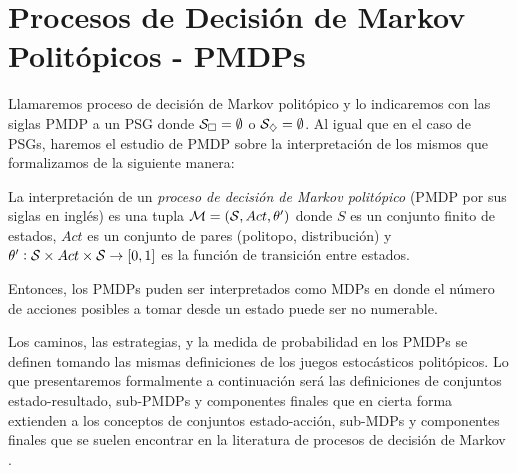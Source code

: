 \section{Procesos de Decisión de Markov Politópicos - PMDPs}
\label{sec:pmdp}

Llamaremos proceso de decisión de Markov politópico y lo indicaremos con las
siglas PMDP a un PSG donde $\mathcal{S}_\square = \emptyset$ o $\mathcal{S}_\diamondsuit = \emptyset$.
Al igual que en el caso de PSGs, haremos el estudio de PMDP sobre la
interpretación de los mismos que formalizamos de la siguiente manera:

\begin{definition}
	La interpretación de un \textit{proceso de decisión de Markov politópico} (PMDP por sus siglas en inglés) es una tupla $\mathcal{M} = (\mathcal{S}, Act, \theta')$ donde $S$ es un conjunto finito de estados, $Act$ es un conjunto de pares (politopo, distribución) y $\theta': \mathcal{S} \times Act \times \mathcal{S} \rightarrow [0, 1]$ es la función de transición entre estados.
\end{definition}

Entonces, los PMDPs puden ser interpretados como MDPs en donde el número de
acciones posibles a tomar desde un estado puede ser no numerable.


Los caminos, las estrategias, y la medida de probabilidad en los PMDPs se
definen tomando las mismas definiciones de los juegos estocásticos politópicos.
Lo que presentaremos formalmente a continuación será las definiciones de
conjuntos estado-resultado, sub-PMDPs y componentes finales que en cierta forma
extienden a los conceptos de conjuntos estado-acción, sub-MDPs y componentes
finales que se suelen encontrar en la literatura de procesos de decisión de
Markov \cite{AlfaroThesis,BaierKatoen}.

